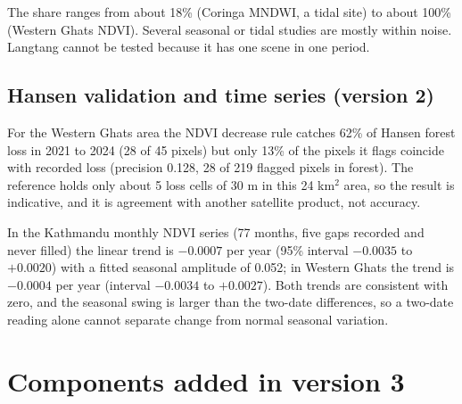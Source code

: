 \documentclass[11pt]{article}
\begin{document}
\begin{table}[t]\centering\small
\caption{Share of fixed-rule changed pixels (primary threshold 0.15) that also exceed three standard errors of scene-to-scene noise.}\label{tab:noise}
\end{table}

The share ranges from about 18\% (Coringa MNDWI, a tidal site) to about 100\% (Western Ghats NDVI). Several seasonal or tidal studies are mostly within noise. Langtang cannot be tested because it has one scene in one period.

\subsection{Hansen validation and time series (version 2)}

For the Western Ghats area the NDVI decrease rule catches 62\% of Hansen forest loss in 2021 to 2024 (28 of 45 pixels) but only 13\% of the pixels it flags coincide with recorded loss (precision 0.128, 28 of 219 flagged pixels in forest). The reference holds only about 5 loss cells of 30 m in this 24 km$^2$ area, so the result is indicative, and it is agreement with another satellite product, not accuracy.

In the Kathmandu monthly NDVI series (77 months, five gaps recorded and never filled) the linear trend is $-0.0007$ per year (95\% interval $-0.0035$ to $+0.0020$) with a fitted seasonal amplitude of 0.052; in Western Ghats the trend is $-0.0004$ per year (interval $-0.0034$ to $+0.0027$). Both trends are consistent with zero, and the seasonal swing is larger than the two-date differences, so a two-date reading alone cannot separate change from normal seasonal variation.

\section{Components added in version 3}
\end{document}
